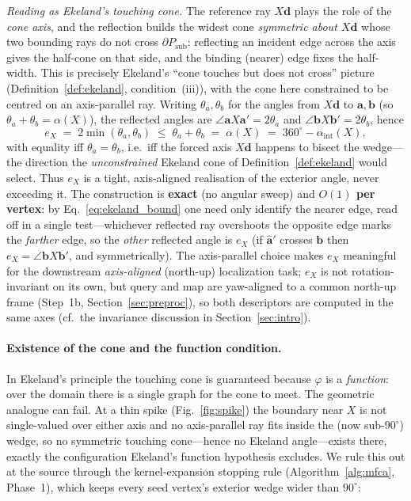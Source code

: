 \documentclass[10pt]{article}
\theoremstyle{plain}
\theoremstyle{definition}
\begin{document}
\noindent\emph{Reading as Ekeland's touching cone.}
The reference ray $X\mathbf{d}$ plays the role of the \emph{cone axis}, and the
reflection builds the widest cone \emph{symmetric about $X\mathbf{d}$} whose two
bounding rays do not cross $\partial P_{\mathrm{sub}}$: reflecting an incident
edge across the axis gives the half-cone on that side, and the binding (nearer)
edge fixes the half-width. This is precisely Ekeland's
``cone touches but does not cross'' picture (Definition~\ref{def:ekeland},
condition~(iii)), with the cone here constrained to be centred on an
axis-parallel ray. Writing $\theta_a,\theta_b$ for the angles from $X\mathbf{d}$
to $\mathbf{a},\mathbf{b}$ (so $\theta_a+\theta_b=\alpha(X)$), the reflected
angles are $\angle\mathbf{a}X\mathbf{a}'=2\theta_a$ and
$\angle\mathbf{b}X\mathbf{b}'=2\theta_b$, hence
\begin{equation}
  e_X \;=\; 2\min(\theta_a,\theta_b)\;\le\;\theta_a+\theta_b\;=\;\alpha(X)
          \;=\;360^\circ-\alpha_{\mathrm{int}}(X),
  \label{eq:ekeland_bound}
\end{equation}
with equality iff $\theta_a=\theta_b$, i.e.\ iff the forced axis $X\mathbf{d}$
happens to bisect the wedge---the direction the \emph{unconstrained} Ekeland cone
of Definition~\ref{def:ekeland} would select. Thus $e_X$ is a tight,
axis-aligned realisation of the exterior angle, never exceeding it.
The construction is \textbf{exact} (no angular sweep) and \textbf{$O(1)$ per
vertex}: by Eq.~\eqref{eq:ekeland_bound} one need only identify the nearer edge,
read off in a single test---whichever reflected ray overshoots the opposite edge
marks the \emph{farther} edge, so the \emph{other} reflected angle is $e_X$ (if
$\hat{\mathbf a}'$ crosses $\mathbf{b}$ then $e_X=\angle\mathbf{b}X\mathbf{b}'$,
and symmetrically). The axis-parallel choice makes $e_X$ meaningful for the
downstream \emph{axis-aligned} (north-up) localization task; $e_X$ is not
rotation-invariant on its own, but query and map are yaw-aligned to a common
north-up frame (Step~1b, Section~\ref{sec:preproc}), so both descriptors are
computed in the same axes (cf.\ the invariance discussion in
Section~\ref{sec:intro}).

\paragraph{Existence of the cone and the function condition.}
In Ekeland's principle the touching cone is guaranteed because $\varphi$ is a
\emph{function}: over the domain there is a single graph for the cone to meet.
The geometric analogue can fail. At a thin spike (Fig.~\ref{fig:spike}) the
boundary near $X$ is not single-valued over either axis and no axis-parallel ray
fits inside the (now sub-$90^\circ$) wedge, so no symmetric touching cone---hence
no Ekeland angle---exists there, exactly the configuration Ekeland's function
hypothesis excludes. We rule this out at the source through the kernel-expansion
stopping rule (Algorithm~\ref{alg:mfca}, Phase~1), which keeps every seed
vertex's exterior wedge wider than $90^\circ$:
\end{document}
